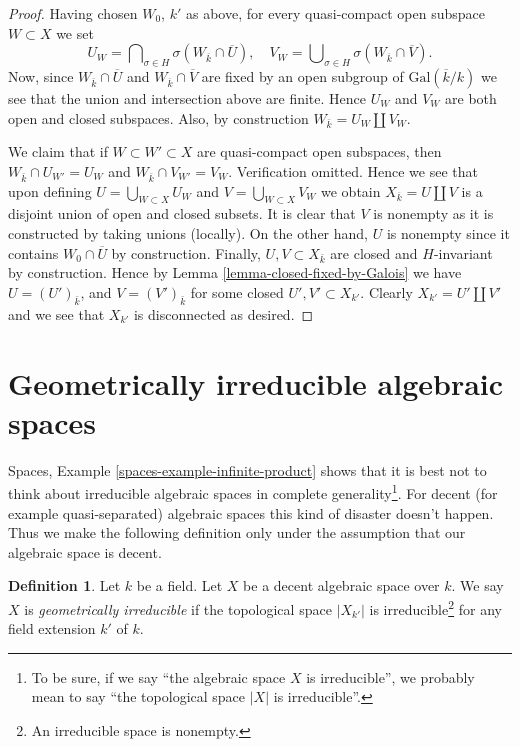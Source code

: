 \documentclass{stacks-project}
\theoremstyle{plain}
\theoremstyle{definition}
\newtheorem{definition}[subsection]{Definition}
\theoremstyle{remark}
\numberwithin{equation}{subsection}
\begin{document}
\begin{proof}
\medskip\noindent
Having chosen $W_0$, $k'$ as above, for every quasi-compact open subspace
$W \subset X$ we set
$$
U_W =
\bigcap\nolimits_{\sigma \in H} \sigma(W_{\overline{k}} \cap \overline{U}),
\quad
V_W =
\bigcup\nolimits_{\sigma \in H} \sigma(W_{\overline{k}} \cap \overline{V}).
$$
Now, since $W_{\overline{k}} \cap \overline{U}$ and
$W_{\overline{k}} \cap \overline{V}$ are fixed by an open subgroup of
$\text{Gal}(\overline{k}/k)$ we see that the union and intersection
above are finite. Hence $U_W$ and $V_W$ are both open and closed subspaces.
Also, by construction $W_{\bar k} = U_W \amalg V_W$.

\medskip\noindent
We claim that if $W \subset W' \subset X$ are quasi-compact
open subspaces, then $W_{\overline{k}} \cap U_{W'} = U_W$ and
$W_{\overline{k}} \cap V_{W'} = V_W$. Verification omitted.
Hence we see that upon defining $U = \bigcup_{W \subset X} U_W$
and $V = \bigcup_{W \subset X} V_W$ we obtain
$X_{\overline{k}} = U \amalg V$ is a disjoint union of open
and closed subsets.
It is clear that $V$ is nonempty as it is constructed by taking
unions (locally). On the other hand, $U$ is nonempty since it contains
$W_0 \cap \overline{U}$ by construction. Finally, $U, V \subset X_{\bar k}$
are closed and $H$-invariant by construction. Hence by
Lemma \ref{lemma-closed-fixed-by-Galois}
we have $U = (U')_{\bar k}$, and $V = (V')_{\bar k}$ for some
closed $U', V' \subset X_{k'}$. Clearly $X_{k'} = U' \amalg V'$
and we see that $X_{k'}$ is disconnected as desired.
\end{proof}






\section{Geometrically irreducible algebraic spaces}
\label{section-geometrically-irreducible}

\noindent
Spaces, Example \ref{spaces-example-infinite-product} shows that it
is best not to think about irreducible algebraic spaces in complete
generality\footnote{To be sure, if we say ``the algebraic space $X$
is irreducible'', we probably mean to say ``the topological space $|X|$
is irreducible''.}. For decent (for example quasi-separated) algebraic spaces
this kind of disaster doesn't happen. Thus we make the following
definition only under the assumption that our algebraic space is decent.

\begin{definition}
\label{definition-geometrically-irreducible}
Let $k$ be a field. 
Let $X$ be a decent algebraic space over $k$.
We say $X$ is {\it geometrically irreducible} if the
topological space $|X_{k'}|$ is
irreducible\footnote{An irreducible space is nonempty.}
for any field extension $k'$ of $k$.
\end{definition}
\end{document}
